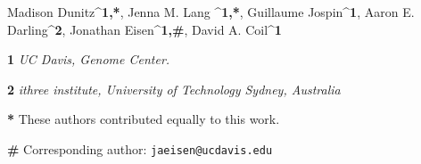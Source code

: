 Madison Dunitz^{\textbf{1,*}}, Jenna M. Lang ^{\textbf{1,*}}, Guillaume Jospin^{\textbf{1}}, Aaron E. Darling^{\textbf{2}}, Jonathan Eisen^{\textbf{1,#}}, David A. Coil^{\textbf{1}} 

\textbf{1} \textit{UC Davis, Genome Center.}

\textbf{2} \textit{ithree institute, University of Technology Sydney, Australia}

\textbf{*} These authors contributed equally to this work.

\textbf{#} Corresponding author: \verb|jaeisen@ucdavis.edu|